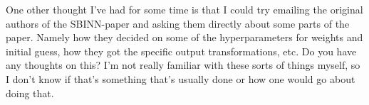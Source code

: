 \documentclass[a4paper]{article}
\begin{document}
One other thought I've had for some time is that I could try emailing the original authors of the SBINN-paper and asking them directly about some parts of the paper. Namely how they decided on some of the hyperparameters for weights and initial guess, how they got the specific output transformations, etc. Do you have any thoughts on this? I'm not really familiar with these sorts of things myself, so I don't know if that's something that's usually done or how one would go about doing that. 
















	
	
	
	
	
	
	
\end{document}
